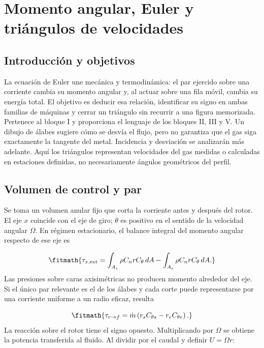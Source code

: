 \documentclass[10pt,openany]{book}
\begin{document}
\studiumchaptercheck

\chapter{Momento angular, Euler y triángulos de velocidades}
\label{chap:c02}


\section{Introducción y objetivos}

La ecuación de Euler une mecánica y termodinámica: el par ejercido sobre una corriente cambia su momento angular y, al actuar sobre una fila móvil, cambia su energía total. El objetivo es deducir esa relación, identificar su signo en ambas familias de máquinas y cerrar un triángulo sin recurrir a una figura memorizada. Pertenece al bloque I y proporciona el lenguaje de los bloques II, III y V.
Un dibujo de álabes sugiere cómo se desvía el flujo, pero no garantiza que el gas siga exactamente la tangente del metal. Incidencia y desviación se analizarán más adelante. Aquí los triángulos representan velocidades del gas medidas o calculadas en estaciones definidas, no necesariamente ángulos geométricos del perfil.

\section{Volumen de control y par}

Se toma un volumen anular fijo que corta la corriente antes y después del rotor. El eje \(x\) coincide con el eje de giro; \(\theta\) es positivo en el sentido de la velocidad angular \(\Omega\). En régimen estacionario, el balance integral del momento angular respecto de ese eje es

\[
\fitmath{\tau_{x,\mathrm{ext}}=\int_{A_s}\rho C_n rC_\theta\,dA-\int_{A_e}\rho C_n rC_\theta\,dA.}
\]
Las presiones sobre caras axisimétricas no producen momento alrededor del eje. Si el único par relevante es el de los álabes y cada corte puede representarse por una corriente uniforme a un radio eficaz, resulta

\[
\fitmath{\tau_{r\to f}=\dot m\left(r_s C_{\theta s}-r_e C_{\theta e}\right).}
\]
La reacción sobre el rotor tiene el signo opuesto. Multiplicando por \(\Omega\) se obtiene la potencia transferida al fluido. Al dividir por el caudal y definir \(U=\Omega r\):
\end{document}
